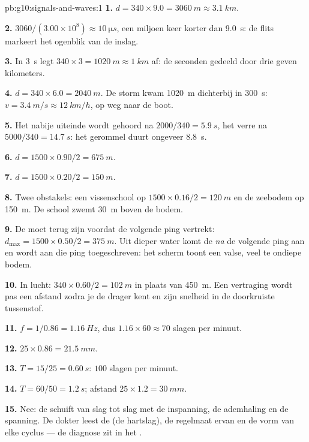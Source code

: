 \begin{solution}{pb:g10:signals-and-waves:1}
\textbf{1.} $d = 340 \times 9.0 = \qty{3060}{m} \approx \qty{3.1}{km}$.

\textbf{2.} $3060/(3.00\times10^{8}) \approx \qty{10}{\micro s}$, een
miljoen keer korter dan \qty{9.0}{s}: de flits markeert het ogenblik van
de inslag.

\textbf{3.} In \qty{3}{s} legt  $340 \times 3 = \qty{1020}{m}
\approx \qty{1}{km}$ af: de seconden gedeeld door drie geven kilometers.

\textbf{4.} $d = 340 \times 6.0 = \qty{2040}{m}$. De storm kwam
\qty{1020}{m} dichterbij in \qty{300}{s}: $v = \qty{3.4}{m/s} \approx
\qty{12}{km/h}$, op weg naar de boot.

\textbf{5.} Het nabije uiteinde wordt gehoord na $2000/340 =
\qty{5.9}{s}$, het verre na $5000/340 = \qty{14.7}{s}$: het gerommel
duurt ongeveer \qty{8.8}{s}.

\textbf{6.} $d = 1500 \times 0.90/2 = \qty{675}{m}$.

\textbf{7.} $d = 1500 \times 0.20/2 = \qty{150}{m}$.

\textbf{8.} Twee obstakels: een vissenschool op $1500 \times 0.16/2 =
\qty{120}{m}$ en de zeebodem op \qty{150}{m}. De school zwemt
\qty{30}{m} boven de bodem.

\textbf{9.} De  moet terug zijn voordat de volgende ping vertrekt:
$d_{\max} = 1500 \times 0.50/2 = \qty{375}{m}$. Uit dieper water komt de
 \emph{na} de volgende ping aan en wordt aan die ping toegeschreven:
het scherm toont een valse, veel te ondiepe bodem.

\textbf{10.} In lucht: $340 \times 0.60/2 = \qty{102}{m}$ in plaats van
\qty{450}{m}. Een vertraging wordt pas een afstand zodra je de drager
kent en zijn snelheid in de doorkruiste tussenstof.

\textbf{11.} $f = 1/0.86 = \qty{1.16}{Hz}$, dus $1.16 \times 60
\approx 70$ slagen per minuut.

\textbf{12.} $25 \times 0.86 = \qty{21.5}{mm}$.

\textbf{13.} $T = 15/25 = \qty{0.60}{s}$: $100$ slagen per minuut.

\textbf{14.} $T = 60/50 = \qty{1.2}{s}$; afstand
$25 \times 1.2 = \qty{30}{mm}$.

\textbf{15.} Nee: de  schuift van slag tot slag met de
inspanning, de ademhaling en de spanning. De dokter leest de  (de
hartslag), de regelmaat ervan en de vorm van elke cyclus --- de diagnose
zit in het .


\end{solution}

